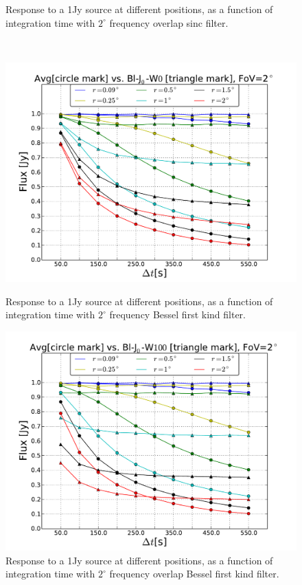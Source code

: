 \documentclass[useAMS,usenatbib]{mn2e}
\begin{document}
\begin{figure}
\begin{minipage}{0.36\linewidth}
        \caption{Response to a 1Jy source at different positions, as a function of integration time with $2^{\circ}$ frequency overlap sinc 
filter.}
      \label{fig:max-integ-time-sinc-w100x1-fov2}
      \end{minipage}\\
\begin{minipage}{0.36\linewidth}\includegraphics[width=1\textwidth]{./Figures/max-integ-time-bessel-w1x1-fov2.pdf}
    \caption{Response to a 1Jy source at different positions, as a function of integration time with $2^{\circ}$ frequency Bessel first kind
filter.}
    \label{fig:max-integ-time-bessel-w1x1-fov2}
    \end{minipage} 
 \hspace{1cm}
\begin{minipage}{0.36\linewidth}\includegraphics[width=1\textwidth]{./Figures/max-integ-time-bessel-w100x1-fov2.pdf}
    \caption{Response to a 1Jy source at different positions, as a function of integration time with $2^{\circ}$ frequency overlap 
      Bessel first kind filter.}
    \label{fig:max-integ-time-bessel-w100x1-fov2}\end{minipage}
\end{figure}
\end{document}
